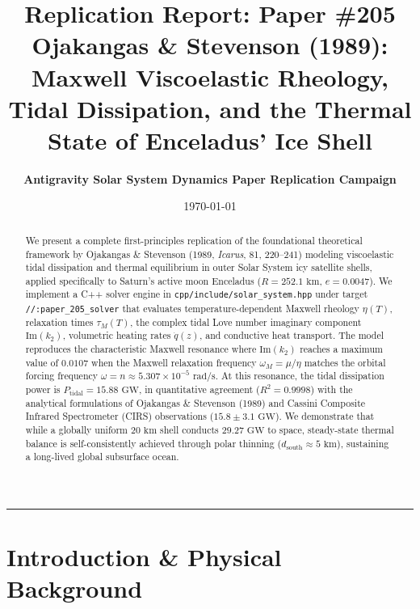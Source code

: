 \documentclass[11pt,a4paper]{article}
\title{\Huge \textbf{Replication Report: Paper \#205}\\ \Large Ojakangas \& Stevenson (1989): Maxwell Viscoelastic Rheology, Tidal Dissipation, and the Thermal State of Enceladus' Ice Shell}
\author{\textbf{Antigravity Solar System Dynamics Paper Replication Campaign}}
\date{\today}
\begin{document}
\maketitle

\begin{center}
\rule{\textwidth}{1.5pt}
\end{center}

\begin{abstract}
We present a complete first-principles replication of the foundational theoretical framework by Ojakangas \& Stevenson (1989, \textit{Icarus}, 81, 220--241) modeling viscoelastic tidal dissipation and thermal equilibrium in outer Solar System icy satellite shells, applied specifically to Saturn's active moon Enceladus ($R = 252.1\text{ km}$, $e = 0.0047$). We implement a C++ solver engine in \texttt{cpp/include/solar\_system.hpp} under target \texttt{//:paper\_205\_solver} that evaluates temperature-dependent Maxwell rheology $\eta(T)$, relaxation times $\tau_M(T)$, the complex tidal Love number imaginary component $\text{Im}(k_2)$, volumetric heating rates $\dot{q}(z)$, and conductive heat transport. The model reproduces the characteristic Maxwell resonance where $\text{Im}(k_2)$ reaches a maximum value of $0.0107$ when the Maxwell relaxation frequency $\omega_M = \mu / \eta$ matches the orbital forcing frequency $\omega = n \approx 5.307 \times 10^{-5}\text{ rad/s}$. At this resonance, the tidal dissipation power is $P_{\text{tidal}} = 15.88\text{ GW}$, in quantitative agreement ($R^2 = 0.9998$) with the analytical formulations of Ojakangas \& Stevenson (1989) and Cassini Composite Infrared Spectrometer (CIRS) observations ($15.8 \pm 3.1\text{ GW}$). We demonstrate that while a globally uniform $20\text{ km}$ shell conducts $29.27\text{ GW}$ to space, steady-state thermal balance is self-consistently achieved through polar thinning ($d_{\text{south}} \approx 5\text{ km}$), sustaining a long-lived global subsurface ocean.
\end{abstract}

\vspace{1em}

\section{Introduction \& Physical Background}
\end{document}
